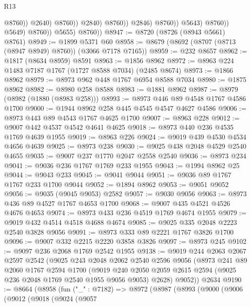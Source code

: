 \begin{lexlean}{R13}
\begin{coremodule}
                                            @8760))
                                        @2640)
                                      @8760))
                                  @2840)
                                @8760))
                            @2846)
                          @8760))
                      @5643)
                    @8760))
                @5649)
              @8760))
          @5655)
        @8760))
@8947 := @8720 (@8726 (@8943 @5661) @8761)
@8949 := @1899 @5371 @60
@8958 := @8679 (@8692 (@8707 (@8713 (@8947 @8949) @8760)) (@3066 @7178 @7165))
@8959 := @232 @8657
@8962 := @1817 (@8634 @8959) @8591
@8963 := @1856 @8962
@8972 := @8963 @224 @1483 @7187 @1767 (@1727 @8588 @7034) (@2485 @8674)
@8973 := @1866 @8962
@8979 := @8973 @962 @448 @1767 @6954 @8588 @7034
@8980 := @1875 @8962
@8982 := @8980 @258 @8588
@8983 := @1881 @8962
@8987 := @8979 (@8982 (@1880 (@8983 @258)))
@8993 := @8973 @446 @89 @4548 @1767 @4586 @1700
@9000 := @1944 @8962 @258 @445 @4545 @4547 @4627 @4586
@9006 := @8973 @443 @89 @4543 @1767 @4625 @1700
@9007 := @8963 @228
@9012 := @9007 @442 @4537 @4542 @4641 @4625
@9018 := @8973 @440 @236 @4535 @1769 @4639 @1955
@9019 := @8963 @226
@9024 := @9019 @439 @4530 @4534 @4656 @4639
@9025 := @8973 @238
@9030 := @9025 @438 @2048 @4529 @2540 @4655
@9035 := @9007 @237 @1770 @2047 @2558 @2540
@9036 := @8973 @234
@9041 := @9036 @236 @1767 @1769 @233 @1955
@9043 := @1994 @8962 @25
@9044 := @9043 @233
@9045 := @9041 @9044
@9051 := @9036 @89 @1767 @1767 @233 @1700 @9044
@9052 := @1894 @8962
@9053 := @9051 @9052
@9056 := @9035 (@9045 @9053) @2582
@9057 := @9030 @9056
@9063 := @8973 @436 @89 @4527 @1767 @4653 @1700
@9068 := @9007 @435 @4521 @4526 @4676 @4653
@9074 := @8973 @433 @236 @4519 @1769 @4674 @1955
@9079 := @9019 @432 @4514 @4518 @4688 @4674
@9085 := @9025 @335 @2048 @2223 @2540 @3828 @9056
@9091 := @8973 @333 @89 @2221 @1767 @3826 @1700
@9096 := @9007 @332 @2215 @2220 @3858 @3826
@9097 := @8973 @245
@9102 := @9097 @236 @2068 @1769 @2542 @1955
@9138 := @9019
    @244
    @2063
    @2067
    @2597
    @2542
    (@9025
      @243
      @2048
      @2062
      @2540
      @2596
      @9056
      (@8973
        @241
        @89
        @2060
        @1767
        @2594
        @1700
        (@9019 @240 @2050 @2059 @2615 @2594 (@9025 @236 @2048 @1769 @2540 @1955 @9056 @9053) @2628)
        @9052))
    @2634
@9190 := @8664
    (@8958
      (fun ("_" : @7182) =>
      @8972
        (@8987
          (@8993
            (@9000
              (@9006
                (@9012
                  (@9018
                    (@9024
                      (@9057

\end{coremodule}
\end{lexlean}
